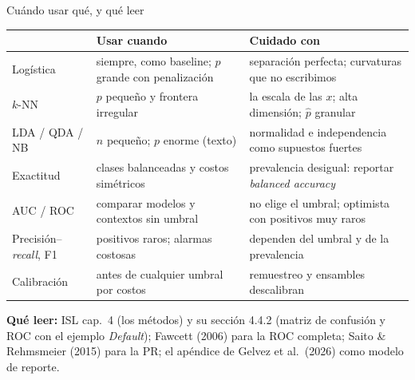 \documentclass{beamer}
\newcommand{\1}{\mathbb{I}}
\begin{document}
\begin{frame}{Cuándo usar qué, y qué leer}
\small
\begin{center}
\scriptsize
\setlength{\tabcolsep}{4pt}
\renewcommand{\arraystretch}{1.2}
\begin{tabular}{lp{4.5cm}p{4.3cm}}
\hline
 & Usar cuando & Cuidado con \\
\hline
Logística & siempre, como baseline; $p$ grande con penalización & separación perfecta; curvaturas que no escribimos \\
$k$-NN & $p$ pequeño y frontera irregular & la escala de las $x$; alta dimensión; $\hat{p}$ granular \\
LDA / QDA / NB & $n$ pequeño; $p$ enorme (texto) & normalidad e independencia como supuestos fuertes \\
Exactitud & clases balanceadas y costos simétricos & prevalencia desigual: reportar \emph{balanced accuracy} \\
AUC / ROC & comparar modelos y contextos sin umbral & no elige el umbral; optimista con positivos muy raros \\
Precisión--\emph{recall}, F1 & positivos raros; alarmas costosas & dependen del umbral y de la prevalencia \\
Calibración & antes de cualquier umbral por costos & remuestreo y ensambles descalibran \\
\hline
\end{tabular}
\end{center}
\pause
\vspace{0.1cm}
\textbf{Qué leer:} ISL cap.\ 4 (los métodos) y su sección 4.4.2 (matriz de confusión y ROC con el ejemplo \emph{Default}); Fawcett (2006) para la ROC completa; Saito \& Rehmsmeier (2015) para la PR; el apéndice de Gelvez et al.\ (2026) como modelo de reporte.
\end{frame}
\end{document}

